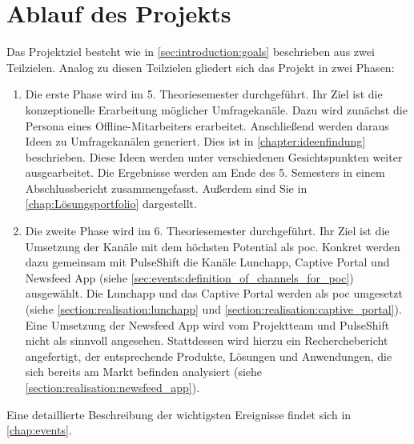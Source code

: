 \section{Ablauf des Projekts}

Das Projektziel besteht wie in \ref{sec:introduction:goals} beschrieben aus zwei Teilzielen. Analog zu diesen Teilzielen gliedert sich das Projekt in zwei Phasen:

\begin{enumerate}
\item Die erste Phase wird im 5. Theoriesemester durchgeführt. Ihr Ziel ist die konzeptionelle Erarbeitung möglicher Umfragekanäle. Dazu wird zunächst die Persona eines Offline-Mitarbeiters erarbeitet. Anschließend werden daraus Ideen zu Umfragekanälen generiert. Dies ist in \ref{chapter:ideenfindung} beschrieben. Diese Ideen werden unter verschiedenen Gesichtspunkten weiter ausgearbeitet. Die Ergebnisse werden am Ende des 5. Semesters in einem Abschlussbericht zusammengefasst. Außerdem sind Sie in \ref{chap:Lösungsportfolio} dargestellt.
\item Die zweite Phase wird im 6. Theoriesemester durchgeführt. Ihr Ziel ist die Umsetzung der Kanäle mit dem höchsten Potential als \gls{poc}. Konkret werden dazu gemeinsam mit PulseShift die Kanäle Lunchapp, Captive Portal und Newsfeed App (siehe \ref{sec:events:definition_of_channels_for_poc}) ausgewählt. Die Lunchapp und das Captive Portal werden als \gls{poc} umgesetzt (siehe \ref{section:realisation:lunchapp} und \ref{section:realisation:captive_portal}). Eine Umsetzung der Newsfeed App wird vom Projektteam und PulseShift nicht als sinnvoll angesehen. Stattdessen wird hierzu ein Recherchebericht angefertigt, der entsprechende Produkte, Lösungen und Anwendungen, die sich bereits am Markt befinden analysiert (siehe \ref{section:realisation:newsfeed_app}). 
\end{enumerate}

Eine detaillierte Beschreibung der wichtigsten Ereignisse findet sich in \vref{chap:events}.